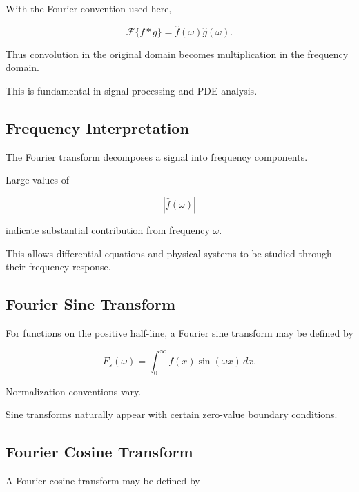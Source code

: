 With the Fourier convention used here,

\[
\boxed{
\mathcal{F}\{f*g\}
=
\widehat{f}(\omega)
\widehat{g}(\omega).
}
\]

Thus convolution in the original domain becomes multiplication in the
frequency domain.

This is fundamental in signal processing and PDE analysis.

\subsection{Frequency Interpretation}
\label{subsec:frequency-interpretation}

The Fourier transform decomposes a signal into frequency components.

Large values of

\[
|\widehat{f}(\omega)|
\]

indicate substantial contribution from frequency \(\omega\).

This allows differential equations and physical systems to be studied
through their frequency response.

\subsection{Fourier Sine Transform}
\label{subsec:fourier-sine-transform}

For functions on the positive half-line, a Fourier sine transform may be
defined by

\[
\boxed{
F_s(\omega)
=
\int_0^\infty
f(x)
\sin(\omega x)
\,dx.
}
\]

Normalization conventions vary.

Sine transforms naturally appear with certain zero-value boundary
conditions.

\subsection{Fourier Cosine Transform}
\label{subsec:fourier-cosine-transform}

A Fourier cosine transform may be defined by

